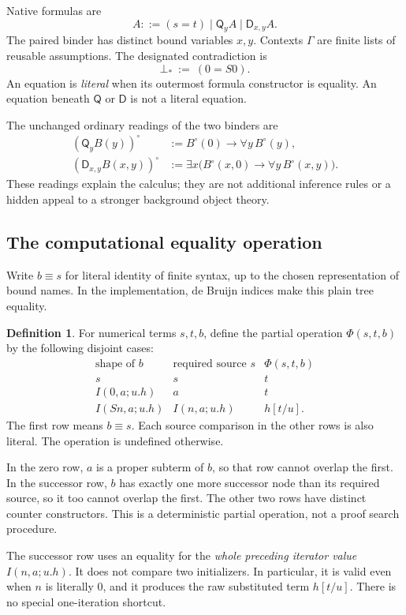 \documentclass[11pt]{article}
\theoremstyle{definition}
\newtheorem{definition}[theorem]{Definition}
\newcommand{\Q}{\mathsf Q}
\newcommand{\D}{\mathsf D}
\newcommand{\syn}{\equiv}
\begin{document}
Native formulas are
\[
 A ::= (s=t)\mid\Q_y A\mid\D_{x,y}A.
\]
The paired binder has distinct bound variables $x,y$. Contexts $\Gamma$
are finite lists of reusable assumptions. The designated contradiction is
\[
 \bot_*\ :=\ (0=S0).
\]
An equation is \emph{literal} when its outermost formula constructor is
equality. An equation beneath $\Q$ or $\D$ is not a literal equation.

The unchanged ordinary readings of the two binders are
\begin{align*}
 (\Q_y B(y))^\circ
   &:= B^\circ(0)\to\forall y\,B^\circ(y),\\
 (\D_{x,y}B(x,y))^\circ
   &:=\exists x\bigl(B^\circ(x,0)\to\forall y\,B^\circ(x,y)\bigr).
\end{align*}
These readings explain the calculus; they are not additional inference
rules or a hidden appeal to a stronger background object theory.

\subsection{The computational equality operation}

Write $b\syn s$ for literal identity of finite syntax, up to the chosen
representation of bound names. In the implementation, de Bruijn indices
make this plain tree equality.

\begin{definition}
For numerical terms $s,t,b$, define the partial operation
$\Phi(s,t,b)$ by the following disjoint cases:
\[
\begin{array}{c|c|c}
\text{shape of }b&\text{required source }s&\Phi(s,t,b)\\ \hline
s&s&t\\
I(0,a;u.h)&a&t\\
I(Sn,a;u.h)&I(n,a;u.h)&h[t/u].
\end{array}
\tag{\(\Phi\)}\label{eq:phi}
\]
The first row means $b\syn s$. Each source comparison in the other rows
is also literal. The operation is undefined otherwise.
\end{definition}

In the zero row, $a$ is a proper subterm of $b$, so that row cannot overlap
the first. In the successor row, $b$ has exactly one more successor node
than its required source, so it too cannot overlap the first. The other
two rows have distinct counter constructors. This is a deterministic
partial operation, not a proof search procedure.

The successor row uses an equality for the \emph{whole preceding iterator
value} $I(n,a;u.h)$. It does not compare two initializers. In particular,
it is valid even when $n$ is literally $0$, and it produces the raw
substituted term $h[t/u]$. There is no special one-iteration shortcut.
\end{document}
